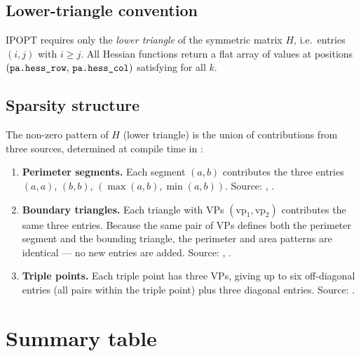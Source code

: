\documentclass[11pt,a4paper]{article}
\begin{document}
\subsection{Lower-triangle convention}
\label{sec:lower-tri}

IPOPT requires only the \emph{lower triangle} of the symmetric matrix $H$,
i.e.\ entries $(i,j)$ with $i \geq j$.  All Hessian functions return a
flat array of values at positions $(\texttt{pa.hess\_row},\,
\texttt{pa.hess\_col})$ satisfying 
for all $k$.

\subsection{Sparsity structure}
\label{sec:sparsity}

The non-zero pattern of $H$ (lower triangle) is the union of contributions
from three sources, determined at compile time in
:

\begin{enumerate}[noitemsep]
  \item \textbf{Perimeter segments.}  Each segment $(a,b)$ contributes the
        three entries $(a,a)$, $(b,b)$, $(\max(a,b),\min(a,b))$.
        Source: , .

  \item \textbf{Boundary triangles.}  Each triangle with VPs
        $(\mathrm{vp}_1,\mathrm{vp}_2)$ contributes the same three
        entries.  Because the same pair of VPs defines both the perimeter
        segment and the bounding triangle, the perimeter and area patterns
        are identical — no new entries are added.
        Source: , .

  \item \textbf{Triple points.}  Each triple point has three VPs, giving
        up to six off-diagonal entries (all pairs within the triple point)
        plus three diagonal entries.  Source:
        .
\end{enumerate}

\section*{Summary table}
\end{document}
